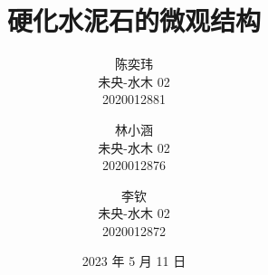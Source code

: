\documentclass[lang = zh]{iarticle}
\author{
  陈奕玮 \\ 未央-水木 02 \\ 2020012881 \and
  林小涵 \\ 未央-水木 02 \\ 2020012876 \and
  李钦  \\ 未央-水木 02 \\ 2020012872
}
\date{2023 年 5 月 11 日}
\title{硬化水泥石的微观结构}
\begin{document}
\maketitle

\begin{abstract}

\end{abstract}

\tableofcontents








\printbibliography[title = 参考文献]
\end{document}
